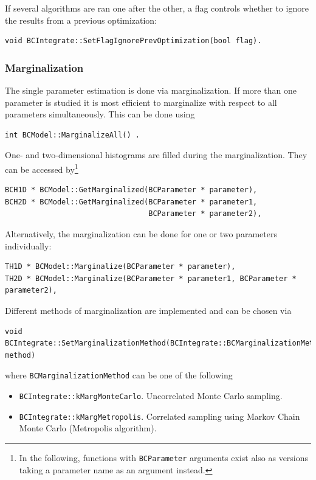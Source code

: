 \documentclass[11pt, a4paper]{article}
\newcommand{\code}[1]{\texttt{#1}}
\begin{document}
If several algorithms are ran one after the other, a flag controls
whether to ignore the results from a previous optimization:
%
\begin{verbatim}
void BCIntegrate::SetFlagIgnorePrevOptimization(bool flag).
\end{verbatim}


\subsubsection{Marginalization}
\label{subsubsection:marginalization}

The single parameter estimation is done via marginalization. If more
than one parameter is studied it is most efficient to marginalize with
respect to all parameters simultaneously. This can be done using
%
\begin{verbatim}
int BCModel::MarginalizeAll() .
\end{verbatim}
%
One- and two-dimensional histograms are filled during the
marginalization. They can be accessed by\footnote{In the following,
  functions with \code{BCParameter} arguments exist also as versions
  taking a parameter name as an argument instead.}
%
\begin{verbatim}
BCH1D * BCModel::GetMarginalized(BCParameter * parameter),
BCH2D * BCModel::GetMarginalized(BCParameter * parameter1,
                                 BCParameter * parameter2),
\end{verbatim}

Alternatively, the marginalization can be done for one or two
parameters individually:
%
\begin{verbatim}
TH1D * BCModel::Marginalize(BCParameter * parameter),
TH2D * BCModel::Marginalize(BCParameter * parameter1, BCParameter * parameter2),
\end{verbatim}

Different methods of marginalization are implemented and can be chosen
via
%
\begin{verbatim}
void BCIntegrate::SetMarginalizationMethod(BCIntegrate::BCMarginalizationMethod method)
\end{verbatim}

where \verb|BCMarginalizationMethod| can be one of the following
%
\begin{itemize}
\item \verb|BCIntegrate::kMargMonteCarlo|. Uncorrelated Monte Carlo sampling.
\item \verb|BCIntegrate::kMargMetropolis|. Correlated sampling using
  Markov Chain Monte Carlo (Metropolis algorithm).
\end{itemize}
\end{document}
